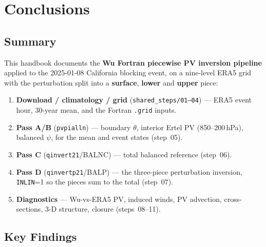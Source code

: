 \chapter{Conclusions}
\label{chap:conclusion}

\section{Summary}

This handbook documents the \textbf{Wu Fortran piecewise PV inversion
pipeline} \cite{Davis1992} applied to the 2025-01-08 California
blocking event, on a nine-level ERA5 grid with the perturbation split
into a \textbf{surface}, \textbf{lower} and \textbf{upper} piece:

\begin{enumerate}\setlength\itemsep{2pt}
  \item \textbf{Download / climatology / grid} (\texttt{shared\_steps/01--04}) ---
        ERA5 event hour, 30-year mean, and the Fortran \texttt{.grid} inputs.
  \item \textbf{Pass A/B} (\texttt{pvpialln}) --- boundary $\theta$,
        interior Ertel PV (850--200\,hPa), balanced $\psi$, for the mean
        and event states (step~05).
  \item \textbf{Pass C} (\texttt{qinvert21}/BALNC) --- total balanced
        reference (step~06).
  \item \textbf{Pass D} (\texttt{qinvertp21}/BALP) --- the three-piece
        perturbation inversion, \texttt{INLIN}=1 so the pieces sum to the
        total (step~07).
  \item \textbf{Diagnostics} --- Wu-vs-ERA5 PV, induced winds, PV
        advection, cross-sections, 3-D structure, closure (steps~08--11).
\end{enumerate}

\section{Key Findings}

